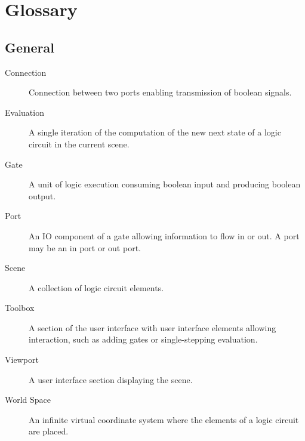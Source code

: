 \documentclass[12pt, a4paper]{article}
\begin{document}
\section{Glossary}
\subsection{General}
\begin{description}
  \item[Connection]
  Connection between two ports enabling transmission of boolean signals.
  \item[Evaluation]
  A single iteration of the computation of the new next state of a logic
  circuit in the current scene.
  \item[Gate]
  A unit of logic execution consuming boolean input and producing boolean
  output.
  \item[Port]
  An IO component of a gate allowing information to flow in or out. A port may be
  an in port or out port.
  \item[Scene]
  A collection of logic circuit elements.
  \item[Toolbox]
  A section of the user interface with user interface elements allowing
  interaction, such as adding gates or single-stepping evaluation.
  \item[Viewport]
  A user interface section displaying the scene.
  \item[World Space]
  An infinite virtual coordinate system where the elements of a logic circuit
  are placed.
\end{description}
\end{document}
